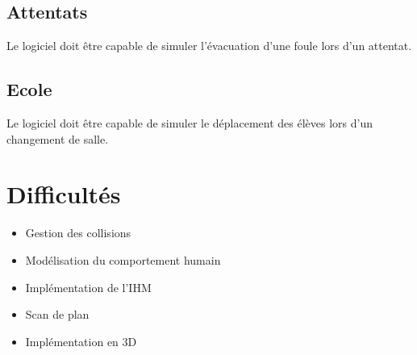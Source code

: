 \documentclass{article}
\begin{document}
    \subsection{Attentats}
    Le logiciel doit être capable de simuler l'évacuation d'une foule lors d'un attentat.
    
    \subsection{Ecole}
    Le logiciel doit être capable de simuler le déplacement des élèves lors d'un changement de salle.
    
\section{Difficultés}
    \begin{itemize}
        \item Gestion des collisions
        \item Modélisation du comportement humain
        \item Implémentation de l'IHM
        \item Scan de plan
        \item Implémentation en 3D
    \end{itemize}
\end{document}
